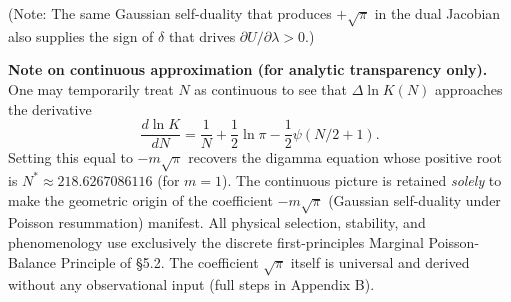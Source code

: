 \documentclass[12pt,a4paper]{article}
\begin{document}
(Note: The same Gaussian self-duality that produces \(+\sqrt{\pi}\) in the dual Jacobian also supplies the sign of \(\delta\) that drives \(\partial U/\partial\lambda > 0\).)

\textbf{Note on continuous approximation (for analytic transparency only).}  
One may temporarily treat \(N\) as continuous to see that \(\Delta\ln K(N)\) approaches the derivative
\[
\frac{d \ln K}{dN} = \frac{1}{N} + \frac12 \ln \pi - \frac12 \psi(N/2 + 1).
\]
Setting this equal to \(-m\sqrt{\pi}\) recovers the digamma equation whose positive root is \(N^* \approx 218.6267086116\) (for \(m=1\)). The continuous picture is retained \emph{solely} to make the geometric origin of the coefficient \(-m\sqrt{\pi}\) (Gaussian self-duality under Poisson resummation) manifest. All physical selection, stability, and phenomenology use exclusively the discrete first-principles Marginal Poisson-Balance Principle of §5.2. The coefficient \(\sqrt{\pi}\) itself is universal and derived without any observational input (full steps in Appendix B).
\end{document}
